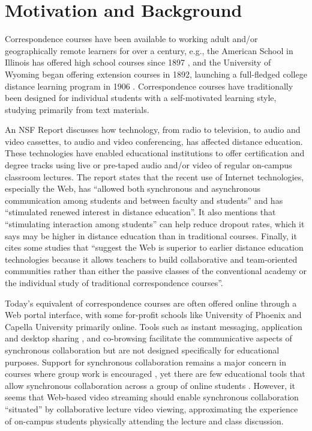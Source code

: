 \documentclass{sig-alternate}
\begin{document}
\section{Motivation and Background} \label{background}


Correspondence courses have been available to working adult and/or
geographically remote learners for over a century, e.g., the American
School in Illinois has offered high school courses since 1897
\cite{AmericanSchool}, and the University of Wyoming began offering
extension courses in 1892, launching a full-fledged college distance
learning program in 1906 \cite{UWyoming}.  Correspondence courses have
traditionally been designed for individual students with a
self-motivated learning style, studying primarily from text materials.


An NSF Report \cite{NSFReport} discusses how technology, from radio to
television, to audio and video cassettes, to audio and video
conferencing, has affected distance education. These technologies have
enabled educational institutions to offer certification and degree
tracks using live or pre-taped audio and/or video of regular on-campus
classroom lectures.  The report states that the recent use of Internet
technologies, especially the Web, has ``allowed both synchronous and
asynchronous communication among students and between faculty and
students'' and has ``stimulated renewed interest in distance
education''. It also mentions that ``stimulating interaction among
students'' can help reduce dropout rates, which it says may be higher
in distance education than in traditional courses. Finally, it cites
some studies that ``suggest the Web is superior to earlier distance
education technologies because it allows teachers to build
collaborative and team-oriented communities rather than either the
passive classes of the conventional academy or the individual study of
traditional correspondence courses''.

Today's equivalent of correspondence courses are often offered online
through a Web portal interface, with some for-profit schools like
University of Phoenix \cite{UPhoenix} and Capella University
\cite{Capella} primarily online.  Tools such as instant messaging,
application and desktop sharing \cite{VNC, WebEx}, and co-browsing
\cite{CAPPS, LIEBERMAN, SIDLER} facilitate the communicative aspects
of synchronous collaboration but are not designed specifically for
educational purposes.  Support for synchronous collaboration remains a
major concern in courses where group work is encouraged \cite{WELLS},
yet there are few educational tools that allow synchronous
collaboration across a group of online students \cite{BURGESS}.
However, it seems that Web-based video streaming should enable
synchronous collaboration ``situated'' by collaborative lecture video
viewing, approximating the experience of on-campus students physically
attending the lecture and class discussion.
\end{document}
